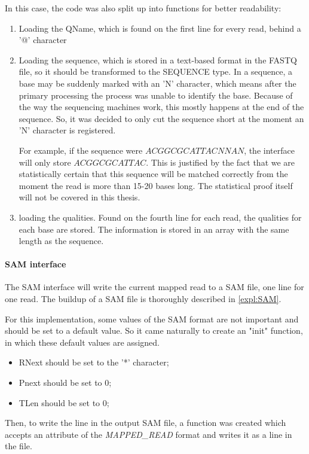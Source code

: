 In this case, the code was also split up into functions for better readability:
\begin{enumerate}
	\item Loading the QName, which is found on the first line for every read, behind a '@' character
	\item Loading the sequence, which is stored in a text-based format in the FASTQ file, so it should be transformed to the SEQUENCE type. In a sequence, a base may be suddenly marked with an 'N' character, which means after the primary processing the process was unable to identify the base. Because of the way the sequencing machines work, this mostly happens at the end of the sequence. So, it was decided to only cut the sequence short at the moment an 'N' character is registered.
	
	For example, if the sequence were $ACGGCGCATTACNNAN$, the interface will only store $ACGGCGCATTAC$. This is justified by the fact that we are statistically certain that this sequence will be matched correctly from the moment the read is more than 15-20 bases long. The statistical proof itself will not be covered in this thesis.
	\item loading the qualities. Found on the fourth line for each read, the qualities for each base are stored. The information is stored in an array with the same length as the sequence.
	
\end{enumerate}


\paragraph{SAM interface} The SAM interface will write the current mapped read to a SAM file, one line for one read. The buildup of a SAM file is thoroughly described in \ref{expl:SAM}.

For this implementation, some values of the SAM format are not important and should be set to a default value. So it came naturally to create an "init" function, in which these default values are assigned. 
\begin{itemize}
	\item RNext should be set to the '*' character;
	\item Pnext should be set to 0;
	\item TLen should be set to 0;
\end{itemize}

Then, to write the line in the output SAM file, a function was created which accepts an attribute of the \emph{MAPPED\_READ} format and writes it as a line in the file.


